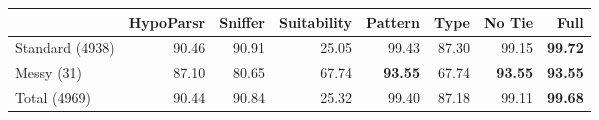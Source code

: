 \begin{tabular}{lrrr|rrrr}
 & HypoParsr & Sniffer & Suitability & Pattern & Type & No Tie & Full\\
\hline
Standard (4938) & 90.46 & 90.91 & 25.05 & 99.43 & 87.30 & 99.15 & \textbf{99.72}\\
Messy (31) & 87.10 & 80.65 & 67.74 & \textbf{93.55} & 67.74 & \textbf{93.55} & \textbf{93.55}\\
Total (4969) & 90.44 & 90.84 & 25.32 & 99.40 & 87.18 & 99.11 & \textbf{99.68}\\
\hline
\end{tabular}